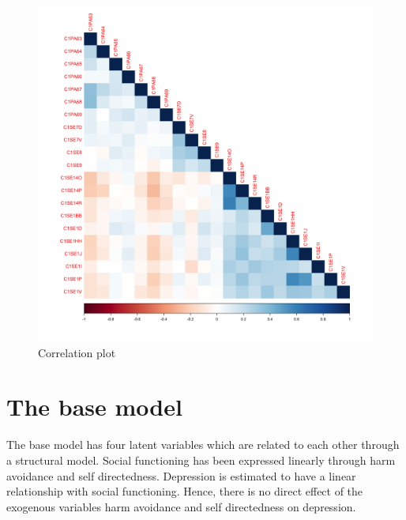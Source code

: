 \documentclass[11pt]{article}
\begin{document}
\begin{figure}[h!]
\centering
\includegraphics[width=14cm]{../visualizations/corr.png}
\caption{Correlation plot}
\end{figure}

\FloatBarrier
\pagebreak
\section{The base model}

The base model has four latent variables which are related to each other through a structural model.
Social functioning has been expressed linearly through harm avoidance and self directedness.
Depression is estimated to have a linear relationship with social functioning.
Hence, there is no direct effect of the exogenous variables harm avoidance and self directedness on depression.
\end{document}
